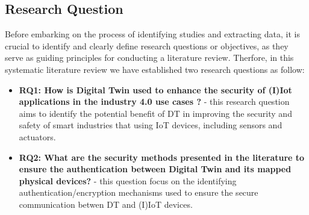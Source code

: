 
\subsection{Research Question}
Before embarking on the process of identifying studies and extracting data, it is crucial to identify and clearly define research questions or objectives, as they serve as guiding principles for conducting a literature review\cite{carrera-rivera_how-conduct_2022}. Therfore, in this systematic literature review we have established two research questions as follow:

\begin{itemize}

    \item \textbf{RQ1: How is Digital Twin used to enhance the security of (I)Iot applications in the industry 4.0 use cases ?} - 
    this research question aims to identify the potential benefit of DT in improving the security and safety of smart industries that using IoT devices, including sensors and actuators.

    \item \textbf{RQ2: What are the security methods presented in the literature to ensure the authentication between Digital Twin and its mapped physical devices?} - 
    this question focus on the identifying  authentication/encryption mechanisms used to ensure the secure communication betwen DT and (I)IoT devices.
\end{itemize}